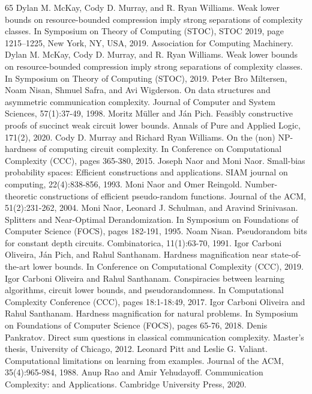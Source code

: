 \documentclass[10pt,a4paper]{article}
\begin{document}
\begin{thebibliography}{65}
 Dylan M. McKay, Cody D. Murray, and R. Ryan Williams. Weak lower bounds on resource-bounded compression imply strong separations of complexity classes. In Symposium on Theory of Computing (STOC), STOC 2019, page 1215–1225, New York, NY, USA, 2019. Association for Computing Machinery.
 Dylan M. McKay, Cody D. Murray, and R. Ryan Williams. Weak lower bounds on resource-bounded compression imply strong separations of complexity classes. In Symposium on Theory of Computing (STOC), 2019.
 Peter Bro Miltersen, Noam Nisan, Shmuel Safra, and Avi Wigderson. On data structures and asymmetric communication complexity. Journal of Computer and System Sciences, 57(1):37-49, 1998.
 Moritz Müller and Ján Pich. Feasibly constructive proofs of succinct weak circuit lower bounds. Annals of Pure and Applied Logic, 171(2), 2020.
 Cody D. Murray and Richard Ryan Williams. On the (non) NP-hardness of computing circuit complexity. In Conference on Computational Complexity (CCC), pages 365-380, 2015.
 Joseph Naor and Moni Naor. Small-bias probability spaces: Efficient constructions and applications. SIAM journal on computing, 22(4):838-856, 1993.
 Moni Naor and Omer Reingold. Number-theoretic constructions of efficient pseudo-random functions. Journal of the ACM, 51(2):231-262, 2004.
 Moni Naor, Leonard J. Schulman, and Aravind Srinivasan. Splitters and Near-Optimal Derandomization. In Symposium on Foundations of Computer Science (FOCS), pages 182-191, 1995.
 Noam Nisan. Pseudorandom bits for constant depth circuits. Combinatorica, 11(1):63-70, 1991.
 Igor Carboni Oliveira, Ján Pich, and Rahul Santhanam. Hardness magnification near state-of-the-art lower bounds. In Conference on Computational Complexity (CCC), 2019.
 Igor Carboni Oliveira and Rahul Santhanam. Conspiracies between learning algorithms, circuit lower bounds, and pseudorandomness. In Computational Complexity Conference (CCC), pages 18:1-18:49, 2017.
 Igor Carboni Oliveira and Rahul Santhanam. Hardness magnification for natural problems. In Symposium on Foundations of Computer Science (FOCS), pages 65-76, 2018.
 Denis Pankratov. Direct sum questions in classical communication complexity. Master’s thesis, University of Chicago, 2012.
 Leonard Pitt and Leslie G. Valiant. Computational limitations on learning from examples. Journal of the ACM, 35(4):965-984, 1988.
 Anup Rao and Amir Yehudayoff. Communication Complexity: and Applications. Cambridge University Press, 2020.

\end{thebibliography}
\end{document}

